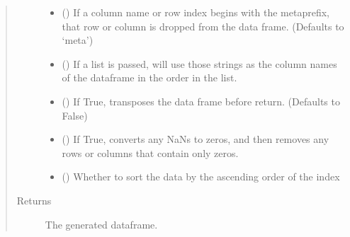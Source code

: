\documentclass[a4paper,10pt,english]{sphinxmanual}
\begin{document}
\begin{fulllineitems}
\begin{quote}
\begin{description}
\begin{itemize}
\item {} 
 () \textendash{} If a column name or row index begins with
the metaprefix, that row or column is dropped from the data frame.
(Defaults to ‘meta’)

\item {} 
 (\sphinxstyleliteralemphasis{\sphinxupquote{{[}}}\sphinxstyleliteralemphasis{\sphinxupquote{{]}}}) \textendash{} If a list is passed, will use those strings
as the column names of the dataframe in the order in the list.

\item {} 
 () \textendash{} If True, transposes the data frame before return.
(Defaults to False)

\item {} 
 () \textendash{} If True, converts any NaNs to zeros, and then
removes any rows or columns that contain only zeros.

\item {} 
 () \textendash{} Whether to sort the data by the ascending order of the
index

\end{itemize}

\item[{Returns}] \leavevmode
The generated dataframe.

\end{description}\end{quote}

\end{fulllineitems}

\end{document}
